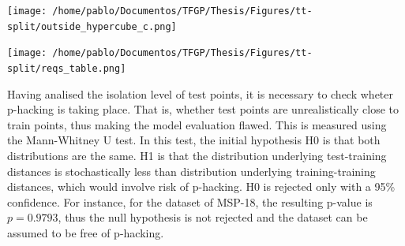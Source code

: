 %
\begin{table}[!htb]
	\centering
	\label{tab:outhypercube}
	\texttt{[image: /home/pablo/Documentos/TFGP/Thesis/Figures/tt-split/outside\_hypercube\_c.png]}
\end{table}
% 
\begin{table}[!htb]
	\centering
	\label{tab:reqsresults}
	\texttt{[image: /home/pablo/Documentos/TFGP/Thesis/Figures/tt-split/reqs\_table.png]}
\end{table}
%
\indent Having analised the isolation level of test points, it is necessary to check wheter p-hacking is taking place. That is, whether test points are unrealistically close to train points, thus making the model evaluation flawed. This is measured using the Mann-Whitney U test\cite{rosner1999use}. In this test, the initial hypothesis H0 is that both distributions are the same. H1 is that the distribution underlying test-training distances is stochastically less than distribution underlying training-training distances, which would involve risk of p-hacking. H0 is rejected only with a 95\% confidence. For instance, for the dataset of MSP-18, the resulting p-value is $p=0.9793$, thus the null hypothesis is not rejected and the dataset can be assumed to be free of p-hacking.\\
%
